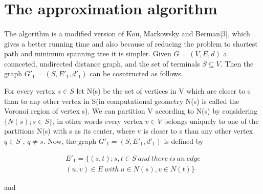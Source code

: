 \documentclass[a4paper,10pt]{article}
\begin{document}
\section{The approximation algorithm}
\paragraph{}
The algorithm is a modified version of Kou, Markowsky and Berman[3], which gives a better running time and also because of reducing the problem to shortest path and minimum spanning tree it is simpler.
Given $G=(V,E,d)$ a connceted, undirected distance graph, and the set of terminals $S \subseteq V$. Then the graph $G'_1 = (S, E'_1,d'_1)$ can be cosntructed as follows.

For every vertex $s \in S$ let N(s) be the set of vertices in V which are closer to s than to any other vertex in S(in computational geometry N(s) is called the Voronoi region of vertex s). We can partition V according to N(s) by considering $ \{ N(s); s \in S  \} $, in other words every vertex $ v\in V $ belongs uniquely to one of the partitions N(s) with s as its center, where v is closer to s than any other vertex $ q\in S$ , $q \neq s$. Now, the graph $G'_1 = (S, E'_1,d'_1)$ is defined by



\begin{flushleft} 
\begin{equation}\label{EP1}
\begin{split}
 E'_1 = \{(s,t); s,t\in S \  and\ there\ is\ an\ edge\\  (u,v)\in E \ with \ u\in N(s), v \in N(t) \}
\end{split}
\end{equation}
\end{flushleft}
and
\end{document}
